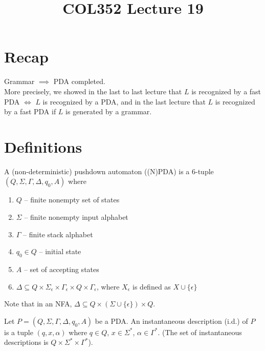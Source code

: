\documentclass[a4paper]{article}
\title{\textbf{COL352 Lecture 19}}
\date{}
\newcommand{\nl}{\vspace{0.2cm}\\}
\begin{document}
\maketitle
\tableofcontents

\section{Recap}

Grammar $\implies$ PDA completed.\nl
More precisely, we showed in the last to last lecture that $L$ is recognized by a fast PDA $\iff$ $L$ is recognized by a PDA, and in the last lecture that $L$ is recognized by a fast PDA if $L$ is
generated by a grammar.

\section{Definitions}

\begin{defn}
    A (non-deterministic) pushdown automaton ((N)PDA) is a 6-tuple $(Q, \Sigma, \Gamma, \Delta, q_0, A)$ where
    \begin{enumerate}
        \item $Q$ -- finite nonempty set of states
        \item $\Sigma$ -- finite nonempty input alphabet
        \item $\Gamma$ -- finite stack alphabet
        \item $q_0 \in Q$ -- initial state
        \item $A$ -- set of accepting states
        \item $\Delta \subseteq Q \times \Sigma_\epsilon \times \Gamma_\epsilon \times Q \times \Gamma_\epsilon$, where $X_\epsilon$ is defined as $X \cup \{\epsilon\}$
    \end{enumerate}
\end{defn}

Note that in an NFA, $\Delta \subseteq Q \times (\Sigma \cup \{\epsilon\}) \times Q$.

\begin{defn}
    Let $P = (Q, \Sigma, \Gamma, \Delta, q_0, A)$ be a PDA. An instantaneous description (i.d.) of $P$ is a tuple $(q, x, \alpha)$ where $q \in Q$, $x \in \Sigma^*$, $\alpha \in \Gamma^*$. (The set
    of instantaneous descriptions is $Q \times \Sigma^* \times \Gamma^*$).
\end{defn}
\end{document}
